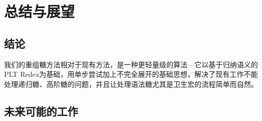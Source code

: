 \pagestyle{fancy}
\normalsize
\linespread{1.5}\selectfont
\chapter{总结与展望}
\section{结论}
我们的重组糖方法相对于现有方法，是一种更轻量级的算法---它以基于归纳语义的PLT Redex为基础，用单步尝试加上不完全展开的基础思想，解决了现有工作不能处理递归糖、高阶糖的问题，并且让处理语法糖尤其是卫生宏的流程简单而自然。

\section{未来可能的工作}